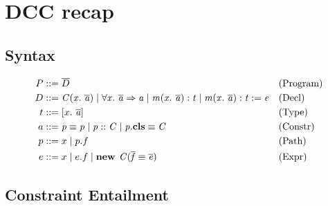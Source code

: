\documentclass[a4paper]{article}
\begin{document}
\section{DCC recap}
\subsection{Syntax}
\label{sec:syntax}
  \begin{align*}
    P &::= \overline{D} && \text{(Program)}\\
    D &::= \mathit{C}(\mathit{x}.\ \mathit{\overline{a}})
      \mid  \forall \mathit{x}.\ \mathit{\overline{a}} \Rightarrow \mathit{a}
      \mid \mathit{m}(\mathit{x}.\ \mathit{\overline{a}}): \mathit{t}
      \mid \mathit{m}(\mathit{x}.\ \mathit{\overline{a}}): \mathit{t} := \mathit{e} && \text{(Decl)}\\
    t &::= [x.\ \mathit{\overline{a}}] && \text{(Type)}\\
    a &::= \mathit{p} \equiv \mathit{p}
      \mid \mathit{p} :: \mathit{C}
      \mid \mathit{p}.\textbf{cls} \equiv \mathit{C} && \text{(Constr)}\\
    p &::= x \mid p.f && \text{(Path)}\\
    e &::= x
      \mid e.f
      \mid \textbf{new } \mathit{C}(\mathit{\mathit{\overline{f}} \equiv \mathit{\overline{e}}}) && \text{(Expr)}
  \end{align*}

\subsection{Constraint Entailment}
\label{sec:constraint-entailment}
\end{document}
